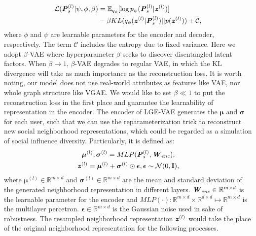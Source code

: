 \documentclass[letterpaper]{article} %
\begin{document}
\begin{equation}
    \begin{split}
        \mathcal{L}(\textbf{\textit{P}}_s^{(l)}|\psi,\phi,\beta)&=
        \mathbb{E}_{q_\phi}[\log p_{\psi}(\textbf{\textit{P}}_s^{(l)}|\textbf{\textit{z}}^{(l)})]\\
        &-\beta KL (q_{\phi}(\textbf{\textit{z}}^{(l)} | \textbf{\textit{P}}_s^{(l)}) || p(\textbf{\textit{z}}^{(l)})) + \mathcal{C},
    \end{split}
\end{equation}
where $\phi$ and $\psi$ are learnable parameters for the encoder and decoder, respectively. The term $\mathcal{C}$ includes the entropy due to fixed variance. Here we adopt $\beta$-VAE where hyperparameter $\beta$ seeks to discover disentangled latent factors. When $\beta \rightarrow 1$, $\beta$-VAE degrades to regular VAE, in which the KL divergence will take as much importance as the reconstruction loss. It is worth noting, our model does not use real-world attributes as features like VAE, nor whole graph structure like VGAE. We would like to set $\beta \ll 1$ to put the reconstruction loss in the first place and guarantee the learnability of representation in the encoder. The encoder of LGE-VAE generates the $\boldsymbol{\mu}$ and $\boldsymbol{\sigma}$ for each user, such that we can use the reparameterization trick to reconstruct new social neighborhood representations, which could be regarded as a simulation of social influence diversity. Particularly, it is defined as:
\begin{gather}
    \boldsymbol{\mu}^{(l)}, \boldsymbol{\sigma}^{(l)} = MLP(\textbf{\textit{P}}_{s}^{(l)}, \textbf{\textit{W}}_{enc}),\\
    \textbf{\textit{z}}^{(l)} = \boldsymbol{\mu}^{(l)}+\boldsymbol{\sigma}^{(l)}\odot\boldsymbol{\epsilon}, \boldsymbol{\epsilon} \sim \mathcal{N}(0,\textbf{I}),
\end{gather}
where $\boldsymbol{\mu}^{(l)} \in \mathbb{R}^{m\times d}$ and $\boldsymbol{\sigma}^{(l)} \in \mathbb{R}^{m\times d}$ are the mean and standard deviation of the generated neighborhood representation in different layers. $\textbf{\textit{W}}_{enc} \in \mathbb{R}^{m\times d}$ is the learnable parameter for the encoder and $MLP(\cdot): \mathbb{R}^{m\times d}\times \mathbb{R}^{d\times d} \mapsto \mathbb{R}^{m\times d}$ is the multilayer percetron. $\boldsymbol{\epsilon} \in \mathbb{R}^{m\times d}$ is the Gaussian noise used in sake of robustness. The resampled neighborhood representation $\textbf{\textit{z}}^{(l)}$ would take the place of the original neighborhood representation for the following processes.
\end{document}
